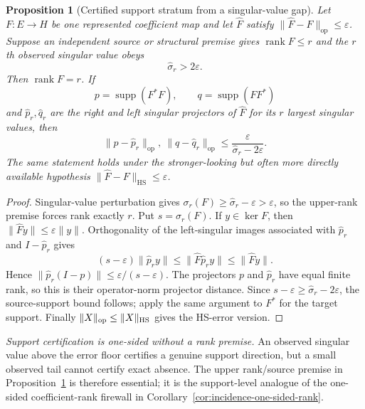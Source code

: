 \documentclass[11pt]{article}
\numberwithin{equation}{section}
\newtheorem{proposition}[theorem]{Proposition}
\theoremstyle{definition}
\theoremstyle{remark}
\newcommand{\HS}{\mathrm{HS}}
\begin{document}
\begin{proposition}[Certified support stratum from a singular-value gap]
\label{thm:certified-support-stratum}
Let $F:E\to H$ be one represented coefficient map and let
$\widehat F$ satisfy
$\|\widehat F-F\|_{\mathrm{op}}\le\varepsilon$.  Suppose an independent
source or structural premise gives $\operatorname{rank}F\le r$ and the
$r$th observed singular value obeys
\[
 \widehat\sigma_r>2\varepsilon.
\]
Then $\operatorname{rank}F=r$.  If
\[
 p=\operatorname{supp}(F^*F),\qquad
 q=\operatorname{supp}(FF^*)
\]
and $\widehat p_r,\widehat q_r$ are the right and left singular projectors of
$\widehat F$ for its $r$ largest singular values, then
\begin{equation}
 \|p-\widehat p_r\|_{\mathrm{op}},\ 
 \|q-\widehat q_r\|_{\mathrm{op}}
 \le
 \frac{\varepsilon}{\widehat\sigma_r-2\varepsilon}.
 \label{eq:certified-support-stratum}
\end{equation}
The same statement holds under the stronger-looking but often more directly
available hypothesis
$\|\widehat F-F\|_{\HS}\le\varepsilon$.
\end{proposition}

\begin{proof}
Singular-value perturbation gives
$\sigma_r(F)\ge\widehat\sigma_r-\varepsilon>\varepsilon$, so the upper-rank
premise forces rank exactly $r$.  Put $s=\sigma_r(F)$.  If
$y\in\ker F$, then $\|\widehat Fy\|\le\varepsilon\|y\|$.  Orthogonality of
the left-singular images associated with $\widehat p_r$ and
$I-\widehat p_r$ gives
\[
 (s-\varepsilon)\|\widehat p_ry\|
 \le\|\widehat F\widehat p_ry\|
 \le\|\widehat Fy\|.
\]
Hence
$\|\widehat p_r(I-p)\|\le\varepsilon/(s-\varepsilon)$.
The projectors $p$ and $\widehat p_r$ have equal finite rank, so this is their
operator-norm projector distance.  Since
$s-\varepsilon\ge\widehat\sigma_r-2\varepsilon$, the source-support bound
follows; apply the same argument to $F^*$ for the target support.  Finally
$\|X\|_{\rm op}\le\|X\|_{\HS}$ gives the HS-error version.
\end{proof}

\noindent\textit{Support certification is one-sided without a rank premise.} An observed singular value above the error floor certifies a genuine support
direction, but a small observed tail cannot certify exact absence.  The upper
rank/source premise in Proposition~\ref{thm:certified-support-stratum} is therefore
essential; it is the support-level analogue of the one-sided coefficient-rank
firewall in Corollary~\ref{cor:incidence-one-sided-rank}.
\end{document}
